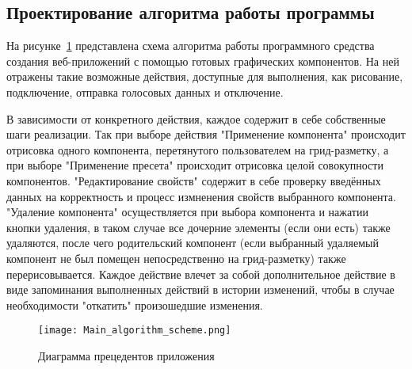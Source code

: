 \subsection{Проектирование алгоритма работы программы}
\label{sec:design:algorithm}

На рисунке~\ref{sec:design:main_algorithm_scheme} представлена схема алгоритма работы программного средства создания веб-приложений с помощью готовых графических компонентов. 
На ней отражены такие возможные действия, доступные для выполнения, как рисование, подключение, отправка голосовых данных и отключение. 

В зависимости от конкретного действия, каждое содержит в себе собственные шаги реализации. Так при выборе действия "Применение компонента" происходит отрисовка одного компонента, перетянутого пользователем на грид-разметку, а при выборе "Применение пресета" происходит отрисовка целой совокупности компонентов. "Редактирование свойств" содержит в себе проверку введённых данных на корректность и процесс измненения свойств выбранного компонента. "Удаление компонента" осуществляется при выбора компонента и нажатии кнопки удаления, в таком случае все дочерние элементы (если они есть) также удаляются, после чего родительский компонент (если выбранный удаляемый компонент не был помещен непосредственно на грид-разметку) также перерисовывается. Каждое действие влечет за собой дополнительное действие в виде запоминания выполненных действий в истории изменений, чтобы в случае необходимости "откатить" произошедшие изменения.\pagebreak

\begin{figure}
\centering
    \texttt{[image: Main\_algorithm\_scheme.png]}
    \caption{Диаграмма прецедентов приложения}
    \label{sec:design:main_algorithm_scheme}
\end{figure}
